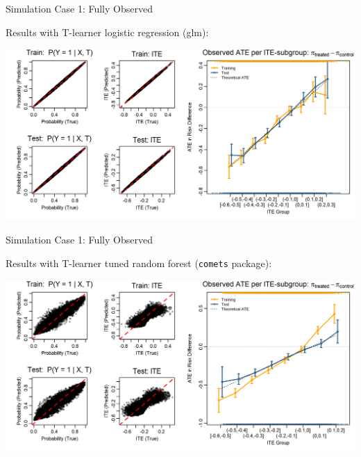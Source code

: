 \documentclass[onlytextwidth,english]{beamer}\usepackage[]{graphicx}\usepackage[]{xcolor}
\begin{document}
\begin{frame}{Simulation Case 1: Fully Observed}

Results with T-learner logistic regression (glm):

\includegraphics[width=\textwidth]{img/fully_observed_glm_tlearner.png}

\end{frame}


\begin{frame}{Simulation Case 1: Fully Observed}

Results with T-learner tuned random forest (\texttt{comets} package):

\includegraphics[width=\textwidth]{img/observed_tuned_rf.png}

\end{frame}
\end{document}
